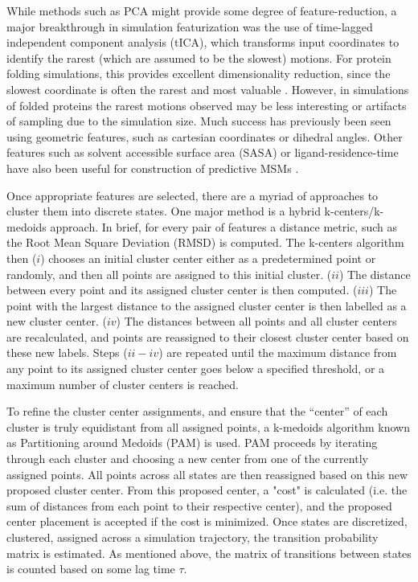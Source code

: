\documentclass[../main.tex]{subfiles}
\begin{document}
        While methods such as PCA might provide some degree of feature-reduction, a major breakthrough in simulation featurization was the use of time-lagged independent component analysis (tICA)\cite{Molgedey:1994ew}, which transforms input coordinates to identify the rarest (which are assumed to be the slowest) motions. For protein folding simulations, this provides excellent dimensionality reduction, since the slowest coordinate is often the rarest and most valuable \cite{MSultan:2017du,PerezHernandez:2013ih}. However, in simulations of folded proteins the rarest motions observed may be less interesting or artifacts of sampling due to the simulation size. Much success has previously been seen using geometric features, such as cartesian coordinates or dihedral angles\cite{Voelz:2010hs,Bowman:2012jd,Sun:2018kx}. Other features such as solvent accessible surface area (SASA) or ligand-residence-time have also been useful for construction of predictive MSMs \cite{Porter:2019hv,Sun:2018kx}. 

		Once appropriate features are selected, there are a myriad of approaches to cluster them into discrete states. One major method is a hybrid k-centers/k-medoids approach\cite{gonzalez_clustering_1985,park_simple_2009}. In brief, for every pair of features a distance metric, such as the Root Mean Square Deviation (RMSD) is computed. The k-centers algorithm then ($i$) chooses an initial cluster center either as a predetermined point or randomly, and then all points are assigned to this initial cluster. ($ii$) The distance between every point and its assigned cluster center is then computed. ($iii$) The point with the largest distance to the assigned cluster center is then labelled as a new cluster center. ($iv$) The distances between all points and all cluster centers are recalculated, and points are reassigned to their closest cluster center based on these new labels.  Steps ($ii-iv$) are repeated until the maximum distance from any point to its assigned cluster center goes below a specified threshold, or a maximum number of cluster centers is reached.

		To refine the cluster center assignments, and ensure that the “center” of each cluster is truly equidistant from all assigned points, a k-medoids algorithm known as Partitioning around Medoids (PAM)\cite{park_simple_2009} is used. PAM proceeds by iterating through each cluster and choosing a new center from one of the currently assigned points. All points across all states are then reassigned based on this new proposed cluster center. From this proposed center, a "cost" is calculated (i.e. the sum of distances from each point to their respective center), and the proposed center placement is accepted if the cost is minimized. Once states are discretized, clustered, assigned across a simulation trajectory, the transition probability matrix is estimated. As mentioned above, the matrix of transitions between states is counted based on some lag time $\tau$. 
\end{document}
